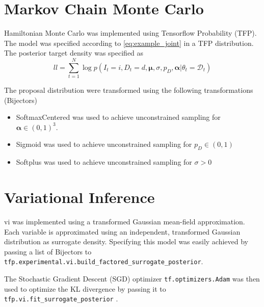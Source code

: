 \section{Markov Chain Monte Carlo}
Hamiltonian Monte Carlo was implemented using Tensorflow Probability (TFP). The model was specified according to \cref{eq:example_joint} in a  TFP distribution. The posterior target density was specified as 
\begin{equation}
    ll = \sum_{t=1}^{N}\log p(I_t=i, D_t=d, \boldsymbol{\mu}, \sigma, p_D, \boldsymbol{\alpha} | \theta_t = \mathcal{D}_t)
\end{equation}

The proposal distribution were transformed using the following transformations (Bijectors)

\begin{itemize}
\item SoftmaxCentered was used to achieve unconstrained sampling for $\boldsymbol{\alpha} \in (0, 1)^3$.
\item Sigmoid was used to achieve unconstrained sampling for $p_D \in (0, 1)$
\item Softplus was used to achieve unconstrained sampling for $\sigma > 0$
\end{itemize}

\section{Variational Inference}

\acrshort{vi} was implemented using a transformed Gaussian mean-field approximation. Each variable is approximated using an independent, transformed Gaussian distribution as surrogate density. Specifying this model was easily achieved by passing a list of Bijectors to \texttt{tfp.experimental.vi.build\_factored\_surrogate\_posterior}. 

The Stochastic Gradient Descent (SGD) optimizer \texttt{tf.optimizers.Adam} was then used to optimize the KL divergence by passing it to \texttt{tfp.vi.fit\_surrogate\_posterior} \cite{tensorflow2015-whitepaper}. 